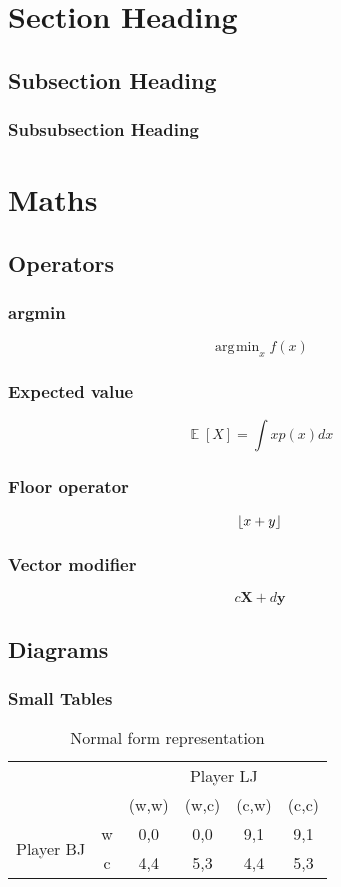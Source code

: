\documentclass{article}
\DeclareMathOperator*{\argmin}{\arg\!\min}
\DeclareMathOperator{\E}{\mathbb{E}}
\DeclarePairedDelimiter\floor{\lfloor}{\rfloor}
\renewcommand{\vec}[1]{\mathbf{#1}} %
\begin{document}
\section{Section Heading}
\subsection{Subsection Heading}
\subsubsection{Subsubsection Heading}

\section{Maths}
\subsection{Operators}
\subsubsection{argmin}
$$\argmin_{x}{f(x)}$$

\subsubsection{Expected value}
$$\E[X] = \int{xp(x)dx}$$

\subsubsection{Floor operator}
$$\floor{x+y}$$

\subsubsection{Vector modifier}
$$c\vec{X} + d\vec{y}$$

\subsection{Diagrams}
\subsubsection{Small Tables}
\begin{table}[H]
  \centering
    \hspace*{-4em}\begin{tabular}{*{6}{c|}}
      \multicolumn{2}{c}{} & \multicolumn{4}{c}{Player LJ} \\
      \cline{3-6}
      \multicolumn{1}{c}{} & & {(w,w)} & {(w,c)} & {(c,w)} & {(c,c)} \\
      \cline{2-6}
      \multirow{2}{*}{Player BJ} & w & 0,0 & 0,0 & \color{red}9,1 & \color{red}9,1 \\
      \cline{2-6}
      & c & \color{red}4,4 & 5,3 & 4,4 & 5,3 \\
      \cline{2-6}
    \end{tabular}
    \caption{Normal form representation}
\end{table}
\end{document}
